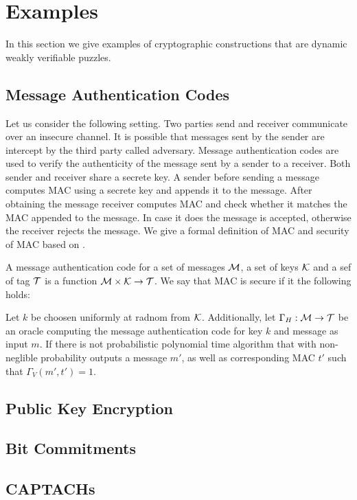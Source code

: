 \documentclass[11pt,a4paper,titlepage]{memoir}
\begin{document}
\section{Examples}
\label{section:wvp_examples}
In this section we give examples of cryptographic constructions that are dynamic weakly verifiable puzzles.
\subsection{Message Authentication Codes}
Let us consider the following setting. Two parties send and receiver communicate over an insecure channel.
It is possible that messages sent by the sender are intercept by the third party called adversary.
Message authentication codes are used to verify the authenticity of the message sent by a sender to a receiver.
Both sender and receiver share a secrete key. A sender before sending a message computes MAC using a secrete key
and appends it to the message. After obtaining the message receiver computes MAC and check whether it matches
the MAC appended to the message. In case it does the message is accepted, otherwise the receiver rejects the message.
We give a formal definition of MAC and security of MAC based on \cite{LectureNotesCrypo}.
\begin{definition}
  A message authentication code for a set of messages $\mathcal{M}$, a set of keys $\mathcal{K}$ and a sef of tag $\mathcal{T}$
  is a function $\mathcal{M} \times \mathcal{K} \rightarrow \mathcal{T}$. We say that MAC is secure if it the following holds:

  Let $k$ be choosen uniformly at radnom from $\mathcal{K}$. Additionally, let $\Gamma_H: \mathcal{M} \rightarrow \mathcal{T}$ be an oracle computing
  the message authentication code for key $k$ and message as input $m$. If there is not probabilistic polynomial time algorithm
  that with non-neglible probability outputs a message $m'$, as well as corresponding MAC $t'$ such that
  $\Gamma_V(m', t') = 1$.
\end{definition}
\subsection{Public Key Encryption}
\subsection{Bit Commitments}
\subsection{CAPTACHs}
\end{document}
